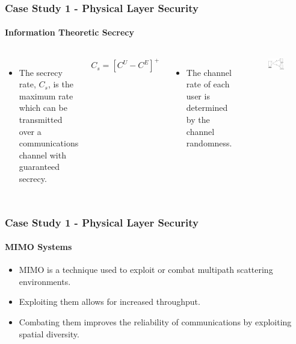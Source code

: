 \documentclass{beamer}
\begin{document}
\begin{frame}
	\frametitle{Case Study 1 - Physical Layer Security}
	\framesubtitle{Information Theoretic Secrecy}
	
	\begin{columns}
	\begin{itemize}
		\item The secrecy rate, $C_s$, is the maximum rate which can be transmitted over a communications channel with guaranteed secrecy.
	\end{itemize}
	
	\begin{equation}
		C_s = \left[C^U - C^E\right]^+
	\end{equation}
	
	\begin{itemize}
		\item The channel rate of each user is determined by the channel randomness.
	\end{itemize}
	
		\begin{figure}
		\centering
		\includegraphics[width = 0.4\paperwidth, height = 0.5\paperheight]{./images/mimome_channel.png}
	\end{figure}
	
	\end{columns}
\end{frame}

\begin{frame}
	\frametitle{Case Study 1 - Physical Layer Security}
	\framesubtitle{MIMO Systems}
	
	
	\begin{itemize}
	    \item MIMO is a technique used to exploit or combat multipath scattering environments. 
	    \item Exploiting them allows for increased throughput.
	    \item Combating  them improves the reliability of communications by exploiting spatial diversity.
	\end{itemize}

\end{frame}
\end{document}
